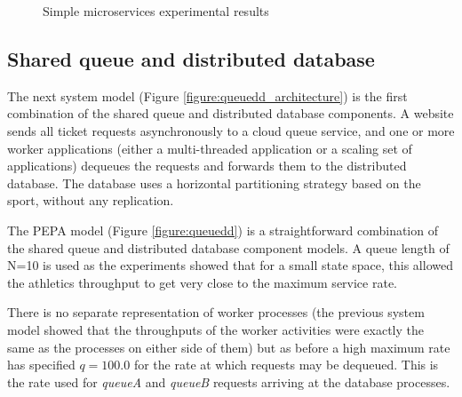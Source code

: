 \begin{figure}
	\label{figure:micro_charts}
	\centering
	\caption{Simple microservices experimental results}
\end{figure}

%
%
\FloatBarrier
\subsection{Shared queue and distributed database}

The next system model (Figure \ref{figure:queuedd_architecture}) is the first combination of the shared queue and distributed database components.  A website sends all ticket requests asynchronously to a cloud queue service, and one or more worker applications (either a multi-threaded application or a scaling set of applications) dequeues the requests and forwards them to the distributed database.  The database uses a horizontal partitioning strategy based on the sport, without any replication.

The PEPA model (Figure \ref{figure:queuedd}) is a straightforward combination of the shared queue and distributed database component models.  A queue length of N=10 is used as the experiments showed that for a small state space, this allowed the athletics throughput to get very close to the maximum service rate.

There is no separate representation of worker processes (the previous system model showed that the throughputs of the worker activities were exactly the same as the processes on either side of them) but as before a high maximum rate has specified $\mathit{q=100.0}$ for the rate at which requests may be dequeued.  This is the rate used for {\itshape queueA} and {\itshape queueB} requests arriving at the database processes.

